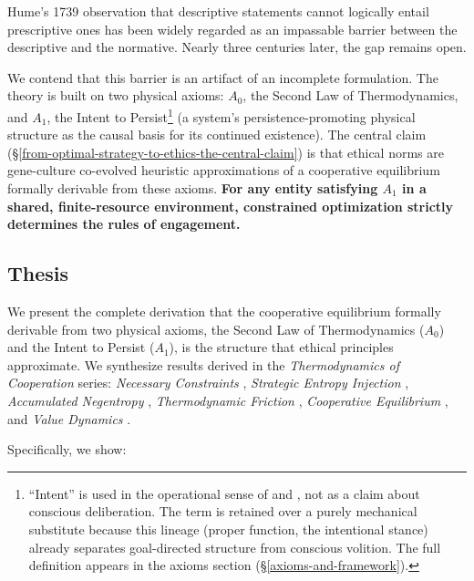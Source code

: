 \documentclass[11pt]{article}
\theoremstyle{plain}
\theoremstyle{definition}
\theoremstyle{remark}
\let\origsubsection\subsection
\renewcommand{\subsection}{\needspace{7\baselineskip}\origsubsection}
\begin{document}
Hume's 1739 observation that descriptive statements cannot logically
entail prescriptive ones \citep[3.1.1]{Hume1739} has been widely
regarded as an impassable barrier between the descriptive and the
normative. Nearly three centuries later, the gap remains open.

We contend that this barrier is an artifact of an incomplete
formulation. The theory is built on two physical axioms: \(A_0\), the
Second Law of Thermodynamics, and \(A_1\), the Intent to
Persist\footnote{``Intent'' is used in the operational sense of
  \citet{Millikan1984} and \citet{Dennett1987}, not as a claim about
  conscious deliberation. The term is retained over a purely mechanical
  substitute because this lineage (proper function, the intentional
  stance) already separates goal-directed structure from conscious
  volition. The full definition appears in the axioms section
  (§\ref{axioms-and-framework}).} (a system's persistence-promoting
physical structure as the causal basis for its continued existence). The
central claim (§\ref{from-optimal-strategy-to-ethics-the-central-claim})
is that ethical norms are gene-culture co-evolved heuristic
approximations of a cooperative equilibrium formally derivable from
these axioms. \textbf{For any entity satisfying \(A_1\) in a shared,
finite-resource environment, constrained optimization strictly
determines the rules of engagement.}

\subsection{Thesis}\label{thesis}

We present the complete derivation that the cooperative equilibrium
formally derivable from two physical axioms, the Second Law of
Thermodynamics (\(A_0\)) and the Intent to Persist (\(A_1\)), is the
structure that ethical principles approximate. We synthesize results
derived in the \emph{Thermodynamics of Cooperation} series:
\emph{Necessary Constraints} \citep{TC-I}, \emph{Strategic Entropy
Injection} \citep{TC-II}, \emph{Accumulated Negentropy} \citep{TC-III},
\emph{Thermodynamic Friction} \citep{TC-IV}, \emph{Cooperative
Equilibrium} \citep{TC-V}, and \emph{Value Dynamics} \citep{TC-VI}.

Specifically, we show:
\end{document}
